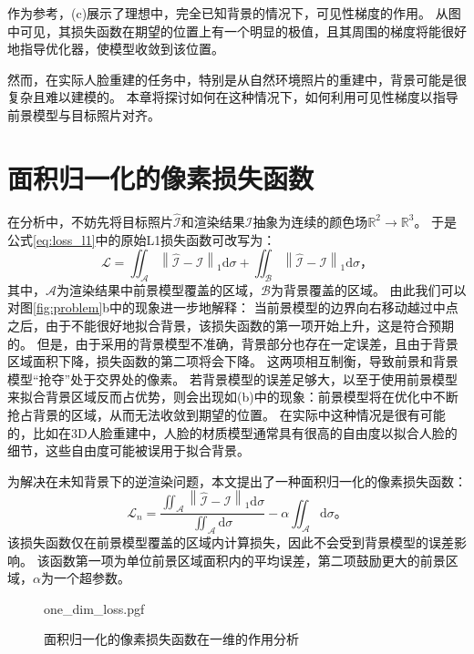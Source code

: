 作为参考，(c)展示了理想中，完全已知背景的情况下，可见性梯度的作用。
从图中可见，其损失函数在期望的位置上有一个明显的极值，且其周围的梯度将能很好地指导优化器，使模型收敛到该位置。

然而，在实际人脸重建的任务中，特别是从自然环境照片的重建中，背景可能是很复杂且难以建模的。
本章将探讨如何在这种情况下，如何利用可见性梯度以指导前景模型与目标照片对齐。

\section{面积归一化的像素损失函数}

在分析中，不妨先将目标照片$\hat{\mathcal{I}}$和渲染结果$\mathcal{I}$抽象为连续的颜色场$\mathbb{R}^2 \to \mathbb{R}^3$。
于是公式\ref{eq:loss_l1}中的原始L1损失函数可改写为：
\begin{equation}
\mathcal{L} = \iint_{\mathcal{A}} \left\| \hat{\mathcal{I}} - \mathcal{I} \right\|_1 \mathrm{d}\sigma +
\iint_{\mathcal{B}} \left\| \hat{\mathcal{I}} - \mathcal{I} \right\|_1 \mathrm{d}\sigma
\text{，}
\label{eq:loss_l1_area}
\end{equation}
其中，$\mathcal{A}$为渲染结果中前景模型覆盖的区域，$\mathcal{B}$为背景覆盖的区域。
由此我们可以对图\ref{fig:problem}b中的现象进一步地解释：
当前景模型的边界向右移动越过中点之后，由于不能很好地拟合背景，该损失函数的第一项开始上升，这是符合预期的。
但是，由于采用的背景模型不准确，背景部分也存在一定误差，且由于背景区域面积下降，损失函数的第二项将会下降。
这两项相互制衡，导致前景和背景模型“抢夺”处于交界处的像素。
若背景模型的误差足够大，以至于使用前景模型来拟合背景区域反而占优势，则会出现如(b)中的现象：前景模型将在优化中不断抢占背景的区域，从而无法收敛到期望的位置。
在实际中这种情况是很有可能的，比如在3D人脸重建中，人脸的材质模型通常具有很高的自由度以拟合人脸的细节，这些自由度可能被误用于拟合背景。

为解决在未知背景下的逆渲染问题，本文提出了一种面积归一化的像素损失函数：
\begin{equation}
\mathcal{L}_n = \frac{\iint_{\mathcal{A}} \left\| \hat{\mathcal{I}} - \mathcal{I} \right\|_1 \mathrm{d}\sigma}
{\iint_{\mathcal{A}}\mathrm{d}\sigma}
-\alpha\iint_{\mathcal{A}}\mathrm{d}\sigma
\text{。}
\label{eq:loss_n}
\end{equation}
该损失函数仅在前景模型覆盖的区域内计算损失，因此不会受到背景模型的误差影响。
该函数第一项为单位前景区域面积内的平均误差，第二项鼓励更大的前景区域，$\alpha$为一个超参数。

\begin{figure}
\centering
{one_dim_loss.pgf}
\caption{面积归一化的像素损失函数在一维的作用分析}
\label{fig:one_dim_loss}
\end{figure}

